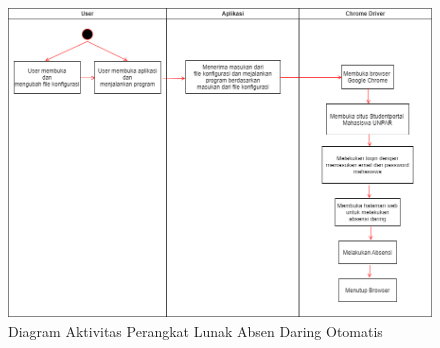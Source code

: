\begin{figure}[H]
	\centering
	\includegraphics[scale=0.5]{Gambar/diagramActivity.png}
	\caption{Diagram Aktivitas Perangkat Lunak Absen Daring Otomatis} 
	\label{fig:diagramActivity}
\end{figure}

